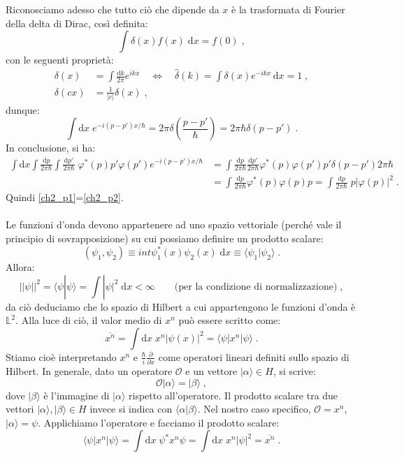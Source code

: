 \documentclass[12pt,a4paper]{report}
\theoremstyle{definition}
\numberwithin{equation}{section}
\newcommand{\diff}[1][]{\mathrm{d}#1}
\newcommand{\bra}{\langle}
\newcommand{\ket}{\rangle}
\begin{document}
Riconosciamo adesso che tutto ciò che dipende da $x$ è la trasformata di Fourier della delta di Dirac, così definita:
$$
\int \delta(x)f(x)\;\diff{x}=f(0)\;,
$$
con le seguenti proprietà:
\begin{align*}
\delta(x) &=\int\frac{\diff{k}}{2\pi}e^{ikx}\quad \Longleftrightarrow\quad \hat{\delta}(k)=\int\delta(x)e^{-ikx}\,\diff{x}=1\;, \\
\delta(cx) &= \frac{1}{|c|}\delta(x)\;,
\end{align*}
dunque:
$$
\int \diff{x}\; e^{-i(p-p')x/\hbar}=2\pi\delta\left(\frac{p-p'}{\hbar}\right)=2\pi\hbar\delta(p-p')\;.
$$
In conclusione, si ha:
\begin{align*}
\int \diff{x}\int\frac{\diff{p}}{2\pi\hbar}\int\frac{\diff{p'}}{2\pi\hbar}\;\varphi^*(p)p'\varphi(p')e^{-i(p-p')x/\hbar} &= \int \frac{\diff{p}}{2\pi\hbar}\frac{\diff{p'}}{2\pi\hbar}\varphi^*(p)\varphi(p')p'\delta(p-p')2\pi\hbar \\
&= \int \frac{\diff{p}}{2\pi\hbar}\varphi^*(p)\varphi(p)p=\int \frac{\diff{p}}{2\pi\hbar}\;p|\varphi(p)|^2\;.
\end{align*}
Quindi \eqref{ch2_p1}=\eqref{ch2_p2}. \\
\\
Le funzioni d'onda devono appartenere ad uno spazio vettoriale (perché vale il principio di sovrapposizione) su cui possiamo definire un prodotto scalare:
$$
(\psi_1,\psi_2)\equiv int \psi_1^*(x)\psi_2(x)\;\diff{x}\equiv \bra \psi_1|\psi_2\ket\;.
$$
Allora:
$$
||\psi||^2=\bra\psi|\psi\ket=\int |\psi|^2\;\diff{x} <\infty \qquad \mbox{(per la condizione di normalizzazione)}\;,
$$
da ciò deduciamo che lo spazio di Hilbert a cui appartengono le funzioni d'onda è $\mathbb{L}^2$. Alla luce di ciò, il valor medio di $x^n$ può essere scritto come:
\begin{equation}
\overline{x^n}=\int \diff{x}\; x^n|\psi(x)|^2=\bra\psi|x^n|\psi\ket\;.
\end{equation}
Stiamo cioè interpretando $x^n$ e $\frac{\hbar}{i}\frac{\partial}{\partial x}$ come operatori lineari definiti sullo spazio di Hilbert. In generale, dato un operatore $\mathcal{O}$ e un vettore $|\alpha\ket \in H$, si scrive:
$$
\mathcal{O}|\alpha\ket=|\beta\ket\;,
$$
dove $|\beta\ket$ è l'immagine di $|\alpha\ket$ rispetto all'operatore. Il prodotto scalare tra due vettori $|\alpha\ket,|\beta\ket\in H$ invece si indica con $\bra\alpha|\beta\ket$. Nel nostro caso specifico, $\mathcal{O}=x^n$, $|\alpha\ket=\psi$. Applichiamo l'operatore e facciamo il prodotto scalare:
$$
\bra\psi|x^n|\psi\ket=\int \diff{x}\;\psi^*x^n\psi=\int\diff{x}\; x^n|\psi|^2=\overline{x^n}\;.
$$
\end{document}
